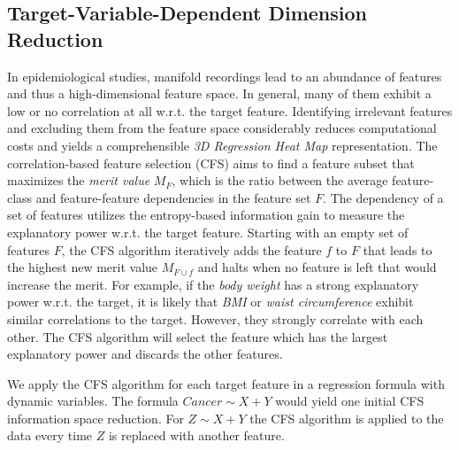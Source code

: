 \documentclass[journal]{style/vgtc} 			          %
\begin{document}
\subsection{Target-Variable-Dependent Dimension Reduction}
In epidemiological studies, manifold recordings lead to an abundance of features and thus a high-dimensional feature space.
In general, many of them exhibit a low or no correlation at all w.r.t. the target feature.
Identifying irrelevant features and excluding them from the feature space considerably reduces computational costs and yields a comprehensible \emph{3D Regression Heat Map} representation.
The correlation-based feature selection (CFS) \cite{CFS} aims to find a feature subset that maximizes the \emph{merit value} $M_F$, which is the ratio between the average feature-class and feature-feature dependencies in the feature set $F$.
The dependency of a set of features utilizes the entropy-based information gain to measure the explanatory power w.r.t. the target feature.
Starting with an empty set of features $F$, the CFS algorithm iteratively adds the feature $f$ to $F$ that leads to the highest new merit value $M_{F\cup f}$ and halts when no feature is left that would increase the merit.
For example, if the \emph{body weight} has a strong explanatory power w.r.t. the target, it is likely that \emph{BMI} or \emph{waist circumference} exhibit similar correlations to the target.
However, they strongly correlate with each other.
The CFS algorithm will select the feature which has the largest explanatory power and discards the other features.

We apply the CFS algorithm for each target feature in a regression formula with dynamic variables.
The formula $Cancer \sim X + Y$ would yield one initial CFS information space reduction.
For $Z \sim X + Y$ the CFS algorithm is applied to the data every time $Z$ is replaced with another feature.
\end{document}
